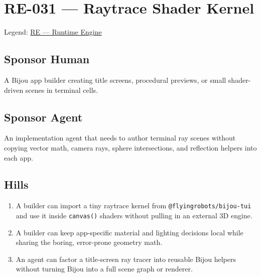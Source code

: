 \chapter{RE-031 --- Raytrace Shader Kernel}\label{record-159}

\smallskip

Legend: \href{https://github.com/flyingrobots/bijou/blob/1853ad902f6bf219326409e7f743a5a1d6517dbc/docs/legends/RE-runtime-engine.md}{RE --- Runtime Engine}

\section{Sponsor Human}\label{record-159-sponsor-human}

A Bijou app builder creating title screens, procedural previews, or small shader-driven scenes in terminal cells.

\section{Sponsor Agent}\label{record-159-sponsor-agent}

An implementation agent that needs to author terminal ray scenes without copying vector math, camera rays, sphere intersections, and reflection helpers into each app.

\section{Hills}\label{record-159-hills}

\begin{enumerate}
\def\labelenumi{\arabic{enumi}.}
\tightlist
\item
  A builder can import a tiny raytrace kernel from \texttt{@\allowbreak{}f\allowbreak{}l\allowbreak{}y\allowbreak{}i\allowbreak{}n\allowbreak{}g\allowbreak{}r\allowbreak{}o\allowbreak{}b\allowbreak{}o\allowbreak{}t\allowbreak{}s\allowbreak{}/\allowbreak{}b\allowbreak{}i\allowbreak{}j\allowbreak{}o\allowbreak{}u\allowbreak{}-\allowbreak{}t\allowbreak{}u\allowbreak{}i} and use it inside \texttt{c\allowbreak{}a\allowbreak{}n\allowbreak{}v\allowbreak{}a\allowbreak{}s\allowbreak{}(\allowbreak{})} shaders without pulling in an external 3D engine.
\item
  A builder can keep app-specific material and lighting decisions local while sharing the boring, error-prone geometry math.
\item
  An agent can factor a title-screen ray tracer into reusable Bijou helpers without turning Bijou into a full scene graph or renderer.
\end{enumerate}

